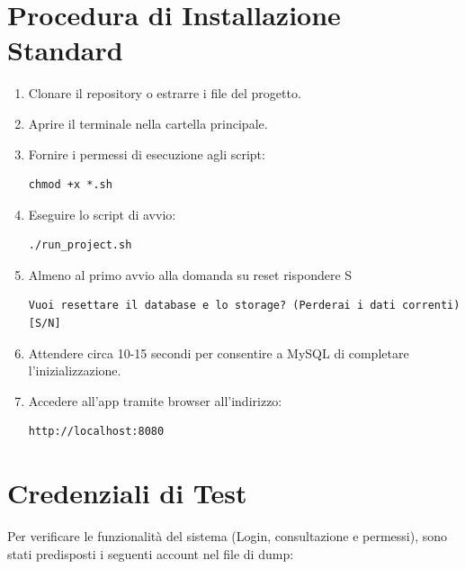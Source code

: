 \section{Procedura di Installazione Standard}
\begin{enumerate}
    \item Clonare il repository o estrarre i file del progetto.
    \item Aprire il terminale nella cartella principale.
    \item Fornire i permessi di esecuzione agli script:
    \begin{verbatim}
chmod +x *.sh
    \end{verbatim}
    \item Eseguire lo script di avvio:
    \begin{verbatim}
./run_project.sh
    \end{verbatim}
    \item Almeno al primo avvio alla domanda su reset rispondere S
    \begin{verbatim}
Vuoi resettare il database e lo storage? (Perderai i dati correnti) [S/N]
    \end{verbatim}
    \item Attendere circa 10-15 secondi per consentire a MySQL di completare l'inizializzazione.
    \item Accedere all'app tramite browser all'indirizzo:
        \begin{verbatim}
http://localhost:8080
        \end{verbatim}
\end{enumerate}

\section{Credenziali di Test}
Per verificare le funzionalità del sistema (Login, consultazione e permessi), sono stati predisposti i seguenti account nel file di dump:


\begin{table}[h!]
\centering
\caption{Credenziali di test pre-caricate nel sistema.}
\label{tab:credenziali}
\end{table}


